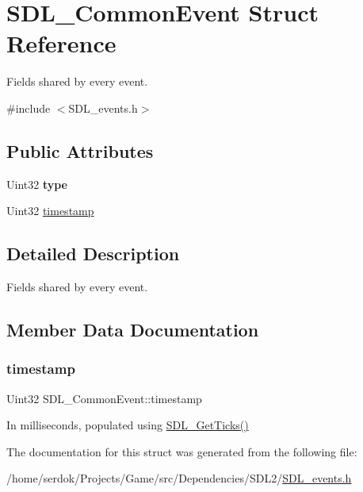 \hypertarget{structSDL__CommonEvent}{}\section{S\+D\+L\+\_\+\+Common\+Event Struct Reference}
\label{structSDL__CommonEvent}


Fields shared by every event.  




{\ttfamily \#include $<$S\+D\+L\+\_\+events.\+h$>$}

\subsection*{Public Attributes}
\begin{DoxyCompactItemize}
\item 
\mbox{\label{structSDL__CommonEvent_a4ecd888325355321b42b2e2956f27453}} 
Uint32 {\bfseries type}
\item 
Uint32 \hyperlink{structSDL__CommonEvent_a7d9046abb021ffc88dd5d32978289e65}{timestamp}
\end{DoxyCompactItemize}


\subsection{Detailed Description}
Fields shared by every event. 

\subsection{Member Data Documentation}
\mbox{\label{structSDL__CommonEvent_a7d9046abb021ffc88dd5d32978289e65}} 
\subsubsection{\texorpdfstring{timestamp}{timestamp}}
{\footnotesize\ttfamily Uint32 S\+D\+L\+\_\+\+Common\+Event\+::timestamp}

In milliseconds, populated using \hyperlink{SDL__timer_8h_a0b9bc71d6287e0ffafdc3419760fe2b3}{S\+D\+L\+\_\+\+Get\+Ticks()} 

The documentation for this struct was generated from the following file\+:\begin{DoxyCompactItemize}
\item 
/home/serdok/\+Projects/\+Game/src/\+Dependencies/\+S\+D\+L2/\hyperlink{SDL__events_8h}{S\+D\+L\+\_\+events.\+h}\end{DoxyCompactItemize}

